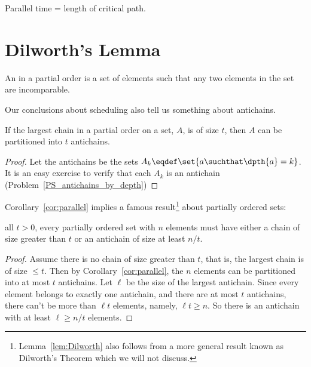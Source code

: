 \begin{corollary}\label{cor:critical-path-time}
Parallel time = length of critical path.
\end{corollary}

\section{Dilworth's Lemma}

\begin{definition}
An  in a partial order is a set of elements such that any
two elements in the set are incomparable.
\end{definition}

Our conclusions about scheduling also tell us something about antichains.

\begin{corollary}\label{cor:parallel}
If the largest chain in a partial order on a set, $A$, is of size $t$,
then $A$ can be partitioned into $t$ antichains.
\end{corollary}

\begin{proof}
Let the antichains be the sets $A_k \eqdef \set{a \suchthat \dpth{a}
  =k}$.
It is an easy exercise to verify that each $A_k$ is an antichain
(Problem~\ref{PS_antichains_by_depth})
\end{proof}

Corollary~\ref{cor:parallel} implies a famous
result\footnote{Lemma~\ref{lem:Dilworth} also follows from a more
  general result known as Dilworth's Theorem which we will not
  discuss.} about partially ordered sets:

\begin{lemma}[Dilworth]\label{lem:Dilworth}
 all $t>0$, every partially ordered set with
$n$ elements must have either a chain of size greater than $t$ or an
antichain of size at least $n / t$.
\end{lemma}

\begin{proof}
Assume there is no chain of size greater than $t$, that is, the largest
chain is of size $\le t$.  Then by Corollary~\ref{cor:parallel}, the $n$
elements can be partitioned into at most $t$ antichains.  Let $\ell$ be
the size of the largest antichain.  Since every element belongs to exactly
one antichain, and there are at most $t$ antichains, there can't be more
than $\ell t$ elements, namely, $\ell t \geq n$.  So there is an antichain
with at least $\ell \geq n / t$ elements.
\end{proof}

